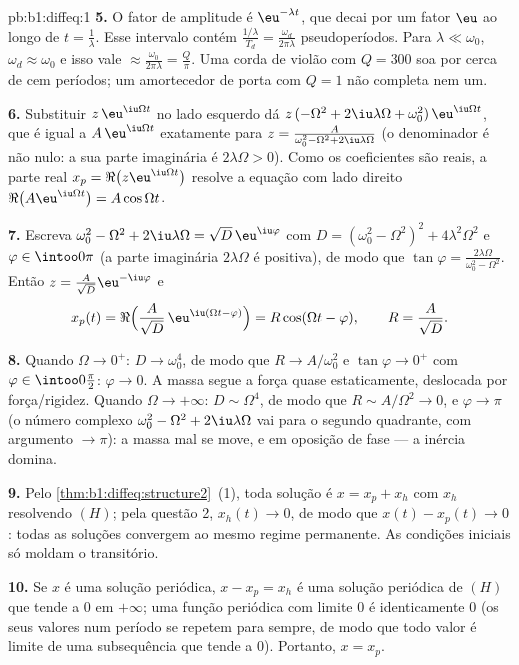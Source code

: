 \begin{solution}{pb:b1:diffeq:1}
\textbf{5.} O fator de amplitude é $\eu^{-\lambda t}$, que
decai por um fator $\eu$ ao longo de $t = \frac1\lambda$. Esse intervalo contém
$\frac{1/\lambda}{T_d} = \frac{\omega_d}{2\pi\lambda}$
pseudoperíodos. Para $\lambda \ll \omega_0$, $\omega_d \approx
\omega_0$ e isso vale $\approx \frac{\omega_0}{2\pi\lambda} =
\frac Q\pi$. Uma corda de violão com $Q = 300$ soa por cerca de cem
períodos; um amortecedor de porta com $Q = 1$ não completa nem um.

\textbf{6.} Substituir $z\,\eu^{\iu\Omega t}$ no lado esquerdo dá
$z\,(-\Omega^2 + 2\iu\lambda\Omega +
\omega_0^2)\,\eu^{\iu\Omega t}$, que é igual a $A\,\eu^{\iu\Omega
t}$
exatamente para $z = \frac{A}{\omega_0^2 - \Omega^2 +
2\iu\lambda\Omega}$ (o denominador é não nulo: a sua parte
imaginária é $2\lambda\Omega > 0$). Como os coeficientes são reais,
a parte real $x_p = \Re\bigl(z\eu^{\iu\Omega t}\bigr)$ resolve a
equação com lado direito $\Re\bigl(A\eu^{\iu\Omega t}\bigr) =
A\cos\Omega t$.

\textbf{7.} Escreva $\omega_0^2 - \Omega^2 + 2\iu\lambda\Omega =
\sqrt{D}\,\eu^{\iu\varphi}$ com $D = (\omega_0^2 - \Omega^2)^2 +
4\lambda^2\Omega^2$ e $\varphi \in \intoo0\pi$ (a parte imaginária
$2\lambda\Omega$ é positiva), de modo que $\tan\varphi =
\frac{2\lambda\Omega}{\omega_0^2 - \Omega^2}$. Então $z =
\frac{A}{\sqrt D}\eu^{-\iu\varphi}$ e
\[
x_p(t) = \Re\Bigl(\frac A{\sqrt D}\,\eu^{\iu(\Omega t -
\varphi)}\Bigr) = R\cos(\Omega t - \varphi),
\qquad R = \frac A{\sqrt D} .
\]

\textbf{8.} Quando $\Omega \to 0^+$: $D \to \omega_0^4$, de modo que $R \to
A/\omega_0^2$ e $\tan\varphi \to 0^+$ com $\varphi \in
\intoo0{\frac\pi2}$: $\varphi \to 0$. A massa segue a força
quase estaticamente, deslocada por força/rigidez. Quando $\Omega \to
+\infty$: $D \sim \Omega^4$, de modo que $R \sim A/\Omega^2 \to 0$, e
$\varphi \to \pi$ (o número complexo $\omega_0^2 - \Omega^2 +
2\iu\lambda\Omega$ vai para o segundo quadrante, com argumento $\to
\pi$): a massa mal se move, e em oposição de fase ---
a inércia domina.

\textbf{9.} Pelo \cref{thm:b1:diffeq:structure2}~(1), toda solução
é $x = x_p + x_h$ com $x_h$ resolvendo $(H)$; pela questão 2, $x_h(t)
\to 0$, de modo que $x(t) - x_p(t) \to 0$: todas as soluções convergem ao
mesmo regime permanente. As condições iniciais só moldam o transitório.

\textbf{10.} Se $x$ é uma solução periódica, $x - x_p = x_h$ é uma
solução periódica de $(H)$ que tende a $0$ em $+\infty$; uma
função periódica com limite $0$ é identicamente $0$ (os seus valores
num período se repetem para sempre, de modo que todo valor é limite de
uma subsequência que tende a $0$). Portanto, $x = x_p$.


\end{solution}
